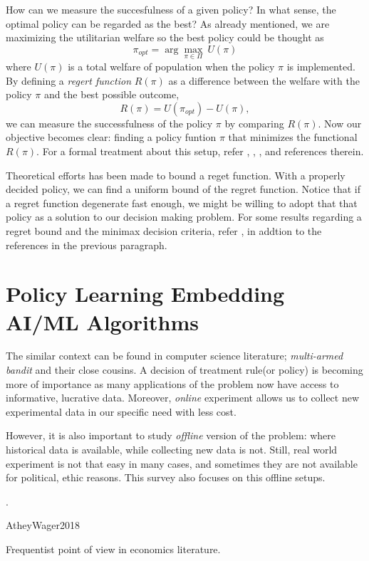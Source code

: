 \documentclass[11pt]{article}
\begin{document}
	 How can we measure the succesfulness of a given policy? In what sense, the optimal policy can be regarded as the best? As already mentioned, we are maximizing the utilitarian welfare so the best policy could be thought as
	 $$
	 \pi_{opt} = \arg \max_{\pi \in \Pi} ~U(\pi)
	 $$
	 where $U(\pi)$ is a total welfare of population when the policy $\pi$ is implemented. By defining a \textit{regert function} $R(\pi)$ as a difference between the welfare with the policy $\pi$ and the best possible outcome,
	 $$
	 R(\pi) = U(\pi_{opt}) - U(\pi),
	 $$
	 we can measure the successfulness of the policy $\pi$ by comparing $R(\pi)$. Now our objective becomes clear: finding a policy funtion $\pi$ that minimizes the functional $R(\pi)$. For a formal treatment about this setup, refer \cite{Manski.2004}, \cite{Kitagawa.2018}, \cite{Athey.2017txo}, and references therein.
	 
	 Theoretical efforts has been made to bound a reget function. With a properly decided policy, we can find a uniform bound of the regret function. Notice that if a regret function degenerate fast enough, we might be willing to adopt that that policy as a solution to our decision making problem. For some results regarding a regret bound and the minimax decision criteria, refer \cite{Stoye.2009}, \cite{Hirano.2009} in addtion to the references in the previous paragraph.

	\section{Policy Learning Embedding AI/ML Algorithms}
	The similar context can be found in computer science literature;  \textit{multi-armed bandit} and their close cousins. A decision of treatment rule(or policy) is becoming more of importance as many applications of the problem now have access to informative, lucrative data. Moreover, \textit{online} experiment allows us to collect new experimental data in our specific need with less cost.
	
	However, it is also important to study \textit{offline} version of the problem: where historical data is available, while collecting new data is not.  Still, real world experiment is not that easy in many cases, and sometimes they are not available for political, ethic reasons. This survey also focuses on this offline setups.
	
	\cite{Dudik.2011}.
	
	 AtheyWager2018
	 	
	Frequentist point of view in economics literature.
	
\end{document}
